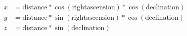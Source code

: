 \documentclass[12pt]{article}
\begin{document}
\pagestyle{empty}
{\newpage
\clearpage
\samepage \begin{align}x &= \mathrm{distance} * \cos(\mathrm{rightascension}) * 
     \cos(\mathrm{declination}) \\ 
y &= \mathrm{distance} * \sin(\mathrm{rightascension}) * 
     \cos(\mathrm{declination}) \\ 
z &= \mathrm{distance} * \sin(\mathrm{declination})
\end{align}
}

\end{document}
